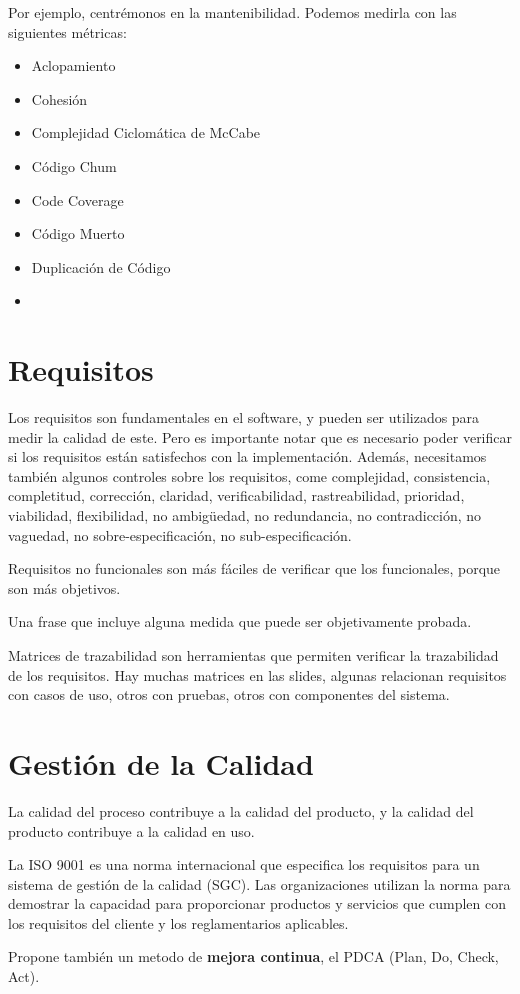 Por ejemplo, centrémonos en la mantenibilidad. Podemos medirla con las siguientes métricas:
\begin{itemize}
   \item Aclopamiento
   \item Cohesión
   \item Complejidad Ciclomática de McCabe
   \item Código Chum
   \item Code Coverage
   \item Código Muerto
   \item Duplicación de Código
   \item 
\end{itemize}


\section{Requisitos}
Los requisitos son fundamentales en el software, y pueden ser utilizados para medir la calidad de este. 
Pero es importante notar que es necesario poder verificar si los requisitos están satisfechos con la implementación.
Además, necesitamos también algunos controles sobre los requisitos, come complejidad, consistencia, completitud, corrección, claridad, verificabilidad, rastreabilidad, prioridad, viabilidad, flexibilidad, no ambigüedad, no redundancia, no contradicción, no vaguedad, no sobre-especificación, no sub-especificación.

Requisitos no funcionales son más fáciles de verificar que los funcionales, porque son más objetivos.
\begin{definition}
   Una frase que incluye alguna medida que puede ser objetivamente probada.
\end{definition}

Matrices de trazabilidad son herramientas que permiten verificar la trazabilidad de los requisitos.
Hay muchas matrices en las slides, algunas relacionan requisitos con casos de uso, otros con pruebas, otros con componentes del sistema.


\section{Gestión de la Calidad}
La calidad del proceso contribuye a la calidad del producto, y la calidad del producto contribuye a la calidad en uso.

La ISO 9001 es una norma internacional que especifica los requisitos para un sistema de gestión de la calidad (SGC). Las organizaciones utilizan la norma para demostrar la capacidad para proporcionar productos y servicios que cumplen con los requisitos del cliente y los reglamentarios aplicables.

Propone también un metodo de \textbf{mejora continua}, el PDCA (Plan, Do, Check, Act).

